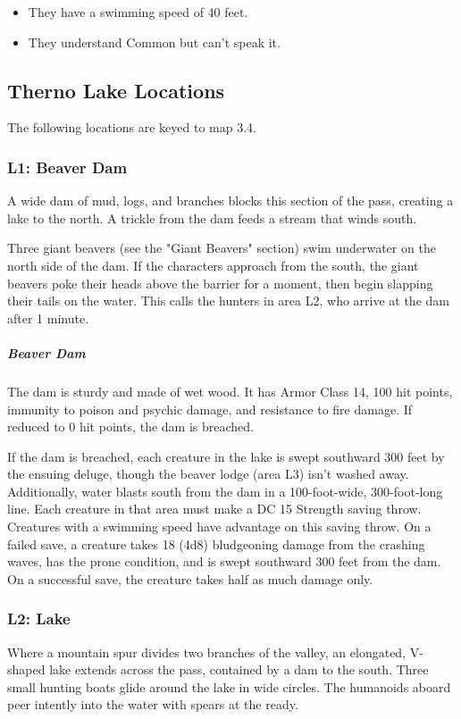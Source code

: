 \documentclass[10pt,a4paper,twoside,bg=print,twocolumn,openany,nodeprecatedcode]{dndbook}
\begin{document}
\begin{itemize}
\item They have a swimming speed of 40 feet.
\item They understand Common but can't speak it.
\end{itemize}

\subsection{Therno Lake Locations}
The following locations are keyed to map 3.4.

\subsubsection{L1: Beaver Dam}
\begin{DndReadAloud}{}
A wide dam of mud, logs, and branches blocks this section of the pass, creating a lake to the north. A trickle from the dam feeds a stream that winds south.

\end{DndReadAloud}

Three giant beavers (see the "Giant Beavers" section) swim underwater on the north side of the dam. If the characters approach from the south, the giant beavers poke their heads above the barrier for a moment, then begin slapping their tails on the water. This calls the hunters in area L2, who arrive at the dam after 1 minute.

\subparagraph{Beaver Dam}
The dam is sturdy and made of wet wood. It has Armor Class 14, 100 hit points, immunity to poison and psychic damage, and resistance to fire damage. If reduced to 0 hit points, the dam is breached.

If the dam is breached, each creature in the lake is swept southward 300 feet by the ensuing deluge, though the beaver lodge (area L3) isn't washed away. Additionally, water blasts south from the dam in a 100-foot-wide, 300-foot-long line. Each creature in that area must make a DC 15 Strength saving throw. Creatures with a swimming speed have advantage on this saving throw. On a failed save, a creature takes 18 (4d8) bludgeoning damage from the crashing waves, has the prone condition, and is swept southward 300 feet from the dam. On a successful save, the creature takes half as much damage only.

\subsubsection{L2: Lake}
\begin{DndReadAloud}{}
Where a mountain spur divides two branches of the valley, an elongated, V-shaped lake extends across the pass, contained by a dam to the south. Three small hunting boats glide around the lake in wide circles. The humanoids aboard peer intently into the water with spears at the ready.

\end{DndReadAloud}
\end{document}
